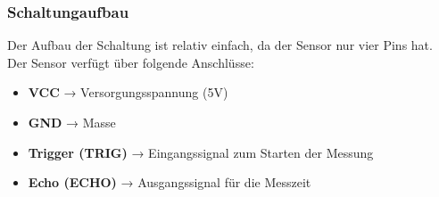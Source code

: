 \documentclass[ngerman,12pt,a4paper]{article}
\begin{document}
		\subsubsection{Schaltungaufbau}
		Der Aufbau der Schaltung ist relativ einfach, da der Sensor nur vier Pins hat.\\
		Der Sensor verfügt über folgende Anschlüsse:
		\begin{itemize}
			\item \textbf{VCC} → Versorgungsspannung (5V)
			\item \textbf{GND} → Masse
			\item \textbf{Trigger (TRIG)} → Eingangssignal zum Starten der Messung
			\item \textbf{Echo (ECHO)} → Ausgangssignal für die Messzeit\\
		\end{itemize}
		
\end{document}
